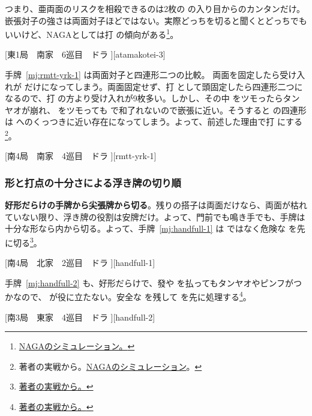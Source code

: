 \documentclass[../nankiru_main.tex]{subfiles}
\begin{document}
つまり、亜両面のリスクを相殺できるのは2枚の  の入り目からのカンタンだけ。嵌張対子の強さは両面対子ほどではない。実際どっちを切ると聞くとどっちでもいいけど、NAGAとしては打  の傾向がある\footnote{\href{https://naga.dmv.nico/htmls/f143d56f8f00aa6ad8623afe877ab353da0cc1a6ca274a3a9baf213994621d75v2_2.html?tw=0}{NAGAのシミュレーション。}}。

[東1局　南家　6巡目　ドラ ][atamakotei-3]

手牌~\ref{mj:rmtt-yrk-1} は両面対子と四連形二つの比較。 両面を固定したら受け入れが  だけになってしまう。両面固定せず、打  として頭固定したら四連形二つになるので、打  の方より受け入れが9枚多い。しかし、その中  をツモったらタンヤオが崩れ、 をツモっても  で和了れないので嵌張に近い。そうすると  の四連形は  へのくっつきに近い存在になってしまう。よって、前述した理由で打  にする\footnote{著者の実戦から。\href{https://naga.dmv.nico/htmls/6833120520950af8ec410c3279b4a3101938cb464eceda84f4febaca5a023c15v2_2.html?tw=0}{NAGAのシミュレーション}。}。

[南4局　南家　4巡目　ドラ ][rmtt-yrk-1]


\subsubsection{形と打点の十分さによる浮き牌の切り順}

\textbf{好形だらけの手牌から尖張牌から切る}。残りの搭子は両面だけなら、両面が枯れていない限り、浮き牌の役割は安牌だけ。よって、門前でも鳴き手でも、手牌は十分な形なら内から切る。よって、手牌~\ref{mj:handfull-1} は  ではなく危険な  を先に切る\footnote{\href{https://naga.dmv.nico/htmls/b1ce439d70b8dfc48152e539f75e29d57763308a9de1dfafc95f65a9529f2757v2_2.html?tw=2}{著者の実戦から。}}。

[南4局　北家　2巡目　ドラ ][handfull-1]

手牌~\ref{mj:handfull-2} も、好形だらけで、發や  を払ってもタンヤオやピンフがつかなので、 が役に立たない。安全な  を残して  を先に処理する\footnote{\href{https://naga.dmv.nico/htmls/d74ee2fcc180f30ce1bccb109223ac1827c57371d858de5d304b683696beabcfv2_2.html?tw=2}{著者の実戦から。}}。

[南3局　東家　4巡目　ドラ ][handfull-2]
\end{document}

